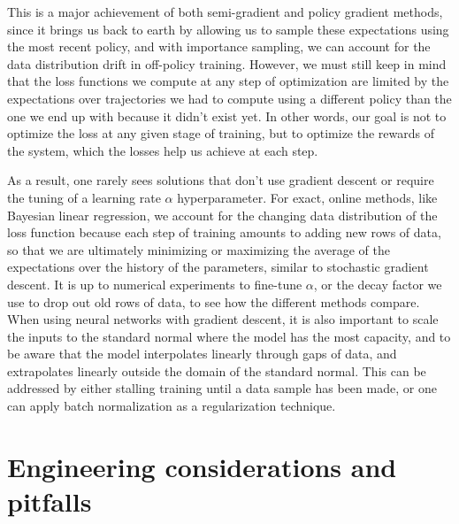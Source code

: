 \documentclass{article}
\begin{document}
This is a major achievement of both semi-gradient and policy gradient methods, since it brings us back to earth by allowing us to sample these expectations using the most recent policy, and with importance sampling, we can account for the data distribution drift in off-policy training. However, we must still keep in mind that the loss functions we compute at any step of optimization are limited by the expectations over trajectories we had to compute using a different policy than the one we end up with because it didn't exist yet. In other words, our goal is not to optimize the loss at any given stage of training, but to optimize the rewards of the system, which the losses help us achieve at each step. 

As a result, one rarely sees solutions that don't use gradient descent or require the tuning of a learning rate $\alpha$ hyperparameter. For exact, online methods, like Bayesian linear regression, we account for the changing data distribution of the loss function because each step of training amounts to adding new rows of data, so that we are ultimately minimizing or maximizing the average of the expectations over the history of the parameters, similar to stochastic gradient descent. It is up to numerical experiments to fine-tune $\alpha$, or the decay factor we use to drop out old rows of data, to see how the different methods compare. When using neural networks with gradient descent, it is also important to scale the inputs to the standard normal where the model has the most capacity, and to be aware that the model interpolates linearly through gaps of data, and extrapolates linearly outside the domain of the standard normal. This can be addressed by either stalling training until a data sample has been made, or one can apply batch normalization\cite{batch_normalization} as a regularization technique.

\section{Engineering considerations and pitfalls}
\end{document}
